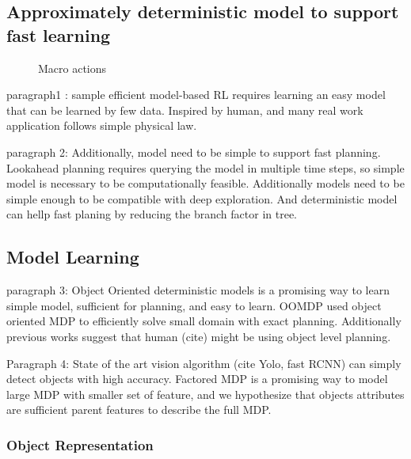 \subsection{Approximately deterministic model to support fast learning}\label{sec:model}

\begin{figure}[tb]
    \centering
    \caption{Macro actions}%
    \label{fig:meta_action}%
\end{figure}

paragraph1 : sample efficient model-based RL requires learning an easy model that can be learned by few data. Inspired by human, and many real work application follows simple physical law.

paragraph 2: Additionally, model need to be simple to support fast planning. Lookahead planning requires querying the model in multiple time steps, so simple model is necessary to be computationally feasible. Additionally models need to be simple enough to be compatible with deep exploration. And deterministic model can hellp fast planing by reducing the branch factor in tree.


\subsection{Model Learning}
paragraph 3: Object Oriented deterministic models is a promising way to learn simple model, sufficient for planning, and easy to learn. OOMDP used object oriented MDP to efficiently solve small domain with exact planning. Additionally previous works suggest that human (cite) might be using object level planning. 

Paragraph 4: State of the art vision algorithm (cite Yolo, fast RCNN) can simply detect objects with high accuracy. Factored MDP is a promising way to model large MDP with smaller set of feature, and we hypothesize that objects attributes  are sufficient parent features to describe the full MDP.
\subsubsection{Object Representation}

